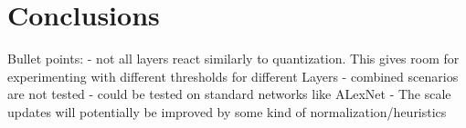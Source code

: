 \chapter{Conclusions\label{cha:chapter6}}

Bullet points:
- not all layers react similarly to quantization. This gives room for experimenting with
different thresholds for different Layers
- combined scenarios are not tested 
- could be tested on standard networks like ALexNet
- The scale updates will potentially be improved by some kind of normalization/heuristics